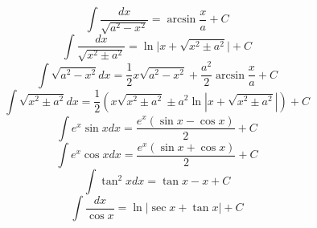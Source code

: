 \documentclass{ctexart}
\begin{document}
\begin{equation}\label{key}
	\int \dfrac{dx}{\sqrt{a^2-x^2}}=\arcsin\dfrac{x}{a}+C
\end{equation}
\begin{equation}\label{key}
	\int \dfrac{dx}{\sqrt{x^2\pm a^2}}=\ln \vert x+\sqrt{x^2 \pm a^2} \vert +C
\end{equation}
\begin{equation}\label{key}
	\int \sqrt{a^2-x^2}dx=\dfrac{1}{2}x\sqrt{a^2-x^2}+\dfrac{a^2}{2}\arcsin \dfrac{x}{a}+C
\end{equation}
\begin{equation}\label{key}
	\int \sqrt{x^{2}\pm a^2}dx=\dfrac{1}{2} \left (x\sqrt{x^2\pm a^2}\pm a^2\ln\left\vert x+\sqrt{x^2 \pm a^2}\right\vert\right )+C
\end{equation}
\begin{equation}\label{key}
	\int e^x \sin x dx=\dfrac{e^x\left (\sin x-\cos x\right)}{2} +C
\end{equation}
\begin{equation}\label{key}
	\int e^x\cos xdx=\dfrac{e^x\left( \sin x+\cos x\right )}{2}+C
\end{equation}
\begin{equation}\label{key}
	\int \tan^2 xdx=\tan x-x+C
\end{equation}
\begin{equation}\label{21}
	\int \dfrac{dx}{\cos x}=\ln \vert \sec x + \tan x\vert +C
\end{equation}
\end{document}
